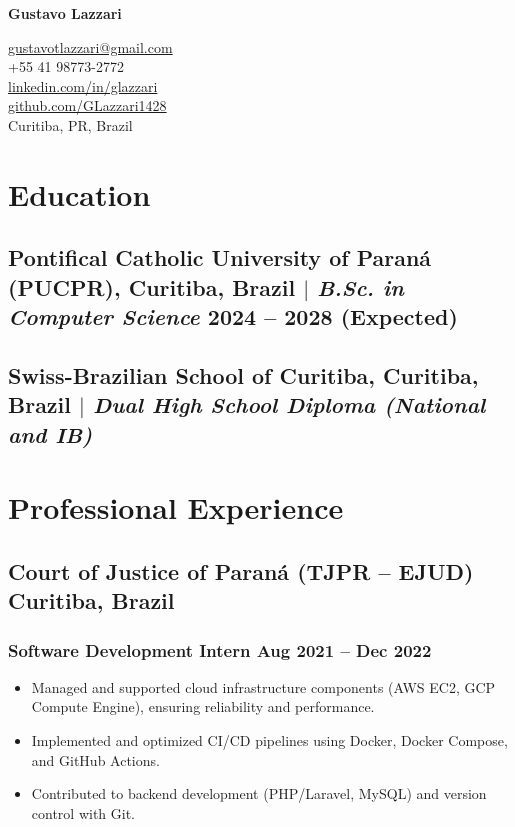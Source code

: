 \documentclass[11pt]{article}
\begin{document}
\begin{center}
	\begin{minipage}{0.5\textwidth}
		{\Huge\bfseries
			Gustavo Lazzari
		} \\ \medskip
	\end{minipage} \hfill
	\begin{minipage}{0.4\textwidth}
		\raggedleft
		\href{mailto:gustavotlazzari@gmail.com}{gustavotlazzari@gmail.com} \\
		+55 41 98773-2772 \\
		\href{https://www.linkedin.com/in/glazzari/}{linkedin.com/in/glazzari} \\
		\href{https://github.com/GLazzari1428}{github.com/GLazzari1428} \\
        Curitiba, PR, Brazil
	\end{minipage}
\end{center}
\vspace{-4mm}

\section{Education}
\subsection{Pontifical Catholic University of Paraná (PUCPR), Curitiba, Brazil $|$ {\normalfont\itshape B.Sc. in Computer Science} \hfill 2024 -- 2028 (Expected)}

\subsection{Swiss-Brazilian School of Curitiba, Curitiba, Brazil $|$ {\normalfont\itshape Dual High School Diploma (National and IB)}}

\section{Professional Experience}
\subsection{Court of Justice of Paraná (TJPR – EJUD) \hfill Curitiba, Brazil}
\subsubsection{Software Development Intern \hfill Aug 2021 -- Dec 2022}
\begin{itemize}
    \item Managed and supported cloud infrastructure components (AWS EC2, GCP Compute Engine), ensuring reliability and performance.
    \item Implemented and optimized CI/CD pipelines using Docker, Docker Compose, and GitHub Actions.
    \item Contributed to backend development (PHP/Laravel, MySQL) and version control with Git.
\end{itemize}
\end{document}
